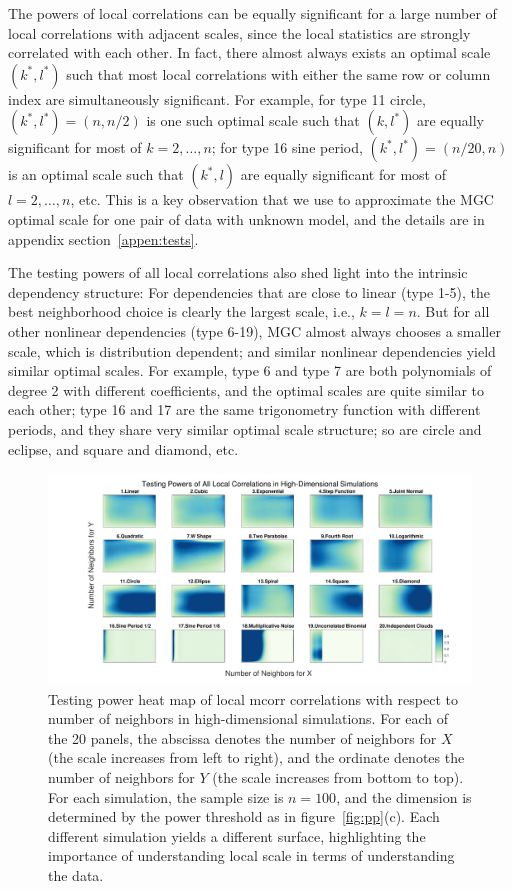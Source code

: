 \documentclass[11pt]{article}
\begin{document}
The powers of local correlations can be equally significant for a large number of local correlations with adjacent scales, since the local statistics are strongly correlated with each other. In fact, there almost always exists an optimal scale $(k^{*},l^{*})$ such that most local correlations with either the same row or column index are simultaneously significant. For example, for type 11 circle, $(k^{*},l^{*})=(n, n/2)$ is one such optimal scale such that $(k,l^{*})$ are equally significant for most of $k=2,\ldots,n$; for type 16 sine period, $(k^{*},l^{*})=(n/20, n)$ is an optimal scale such that $(k^{*},l)$ are equally significant for most of $l=2,\ldots,n$, etc. This is a key observation that we use to approximate the MGC optimal scale for one pair of data with unknown model, and the details are in appendix section~\ref{appen:tests}.

The testing powers of all local correlations also shed light into the intrinsic dependency structure: For dependencies that are close to linear (type 1-5), the best neighborhood choice is clearly the largest scale, i.e., $k=l=n$. But for all other nonlinear dependencies (type 6-19), MGC almost always chooses a smaller scale, which is distribution dependent; and similar nonlinear dependencies yield similar optimal scales. For example, type 6 and type 7 are both polynomials of degree 2 with different coefficients, and the optimal scales are quite similar to each other; type 16 and 17 are the same trigonometry function with different periods, and they share very similar optimal scale structure; so are circle and eclipse, and square and diamond, etc.

\begin{figure}[htbp]
\includegraphics[width=1.0\textwidth]{Figures/Fig6}
\caption{Testing power heat map of local mcorr correlations with respect to number of neighbors in high-dimensional simulations.
For each of the 20 panels, the abscissa denotes the number of neighbors for $X$ (the scale increases from left to right), and the ordinate denotes the number of neighbors for $Y$ (the scale increases from bottom to top). For each simulation, the sample size is $n=100$, and the dimension is determined by the power threshold as in figure~\ref{fig:pp}(c). Each different simulation yields a different surface, highlighting the importance of understanding local scale in terms of understanding the data. }
\label{figSim6}
\end{figure}
\end{document}
